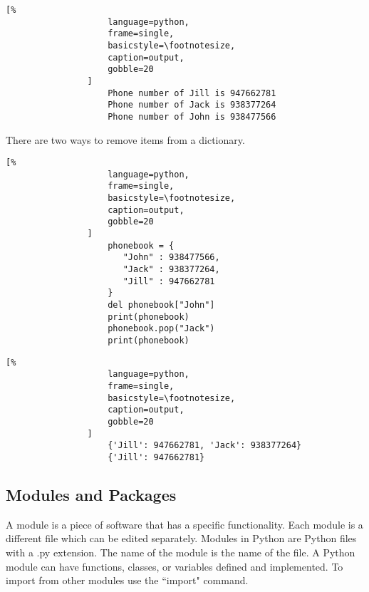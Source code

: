 \documentclass[crop=false,class=book]{standalone}
\begin{document}
            \begin{minipage}[t]{.48\textwidth}
                \centering
                \begin{lstlisting}[%
                    language=python,
                    frame=single,
                    basicstyle=\footnotesize,
                    caption=output,
                    gobble=20
                ]
                    Phone number of Jill is 947662781
                    Phone number of Jack is 938377264
                    Phone number of John is 938477566
                \end{lstlisting}
            \end{minipage}
            There are two ways to remove items from a
            dictionary.\newline
            \begin{minipage}[t]{.48\textwidth}
                \centering
                \begin{lstlisting}[%
                    language=python,
                    frame=single,
                    basicstyle=\footnotesize,
                    caption=output,
                    gobble=20
                ]
                    phonebook = {
                       "John" : 938477566,
                       "Jack" : 938377264,
                       "Jill" : 947662781
                    }
                    del phonebook["John"]
                    print(phonebook)
                    phonebook.pop("Jack")
                    print(phonebook)
                \end{lstlisting}
            \end{minipage}\hfill
            \begin{minipage}[t]{.48\textwidth}
                \centering
                \begin{lstlisting}[%
                    language=python,
                    frame=single,
                    basicstyle=\footnotesize,
                    caption=output,
                    gobble=20
                ]
                    {'Jill': 947662781, 'Jack': 938377264}
                    {'Jill': 947662781}
                \end{lstlisting}
            \end{minipage}
        \subsection{Modules and Packages}
        A module is a piece of software that has a specific
        functionality. Each module is a different file which can be
        edited separately. Modules in Python are Python files with a
        .py extension. The name of the module is the name of the
        file. A Python module can have functions, classes, or
        variables defined and implemented. To import from other
        modules use the ``import" command.
\end{document}
